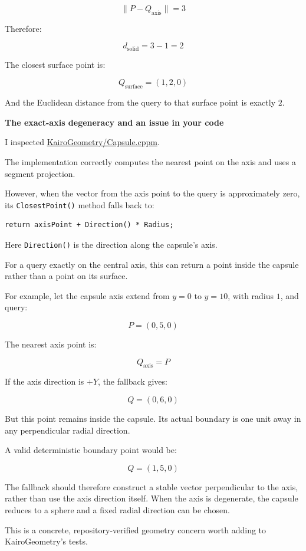 \[
\|P-Q_{\mathrm{axis}}\|=3
\]

Therefore:

\[
d_{\mathrm{solid}}=3-1=2
\]

The closest surface point is:

\[
\boxed{Q_{\mathrm{surface}}=(1,2,0)}
\]

And the Euclidean distance from the query to that surface point is exactly \(2\).

\textbf{The exact-axis degeneracy and an issue in your code}

I inspected \href{https://github.com/swayam8624/KairoGeometry/blob/master/Capsule.cppm?utm_source=chatgpt.com}{KairoGeometry/Capsule.cppm}.

The implementation correctly computes the nearest point on the axis and uses a segment projection.

However, when the vector from the axis point to the query is approximately zero, its \texttt{ClosestPoint()} method falls back to:

\begin{verbatim}
return axisPoint + Direction() * Radius;
\end{verbatim}

Here \texttt{Direction()} is the direction along the capsule's axis.

For a query exactly on the central axis, this can return a point inside the capsule rather than a point on its surface.

For example, let the capsule axis extend from \(y=0\) to \(y=10\), with radius \(1\), and query:

\[
P=(0,5,0)
\]

The nearest axis point is:

\[
Q_{\mathrm{axis}}=P
\]

If the axis direction is \(+Y\), the fallback gives:

\[
Q=(0,6,0)
\]

But this point remains inside the capsule. Its actual boundary is one unit away in any perpendicular radial direction.

A valid deterministic boundary point would be:

\[
Q=(1,5,0)
\]

The fallback should therefore construct a stable vector perpendicular to the axis, rather than use the axis direction itself. When the axis is degenerate, the capsule reduces to a sphere and a fixed radial direction can be chosen.

This is a concrete, repository-verified geometry concern worth adding to KairoGeometry's tests.

